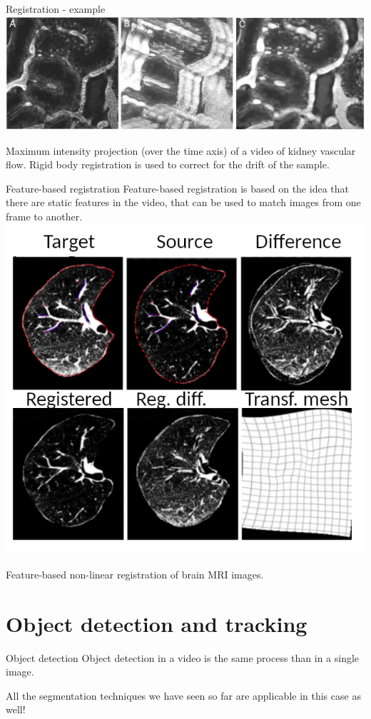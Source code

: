 \documentclass[9pt, aspectratio=169]{beamer}
\begin{document}
\begin{frame}
    {Registration - example}
    \includegraphics[width=\textwidth]{Lorenz2013_registration.png}

    \footnotesize
    Maximum intensity projection (over the time axis) of a video of kidney vascular flow. Rigid body registration is used to correct for the drift of the sample.
\end{frame}

\begin{frame}
    {Feature-based registration}
    Feature-based registration is based on the idea that there are static features in the video, that can be used to match images from one frame to another.
    \centering
    \includegraphics[width=.5\textwidth]{Alam2017_registration.png}

    \footnotesize
    Feature-based non-linear registration of brain MRI images.
\end{frame}
\section{Object detection and tracking}

\begin{frame}
    {Object detection}
    Object detection in a video is the same process than in a single image.

    All the segmentation techniques we have seen so far are applicable in this case as well!
\end{frame}
\end{document}
